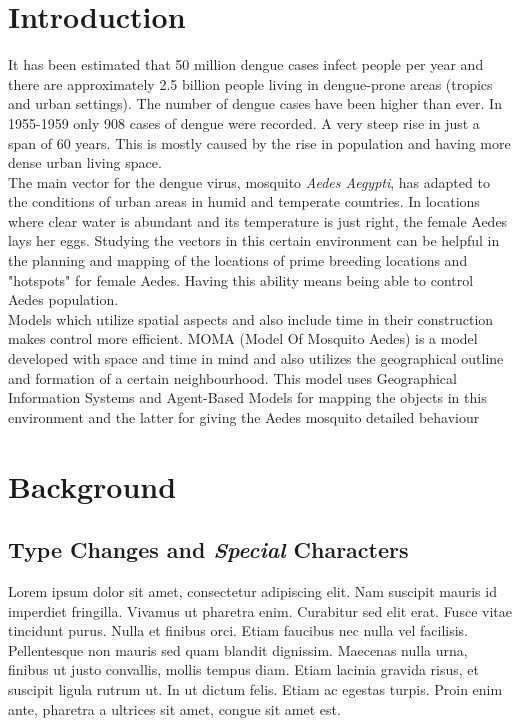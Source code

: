 \section{Introduction}

It has been estimated that 50 million dengue cases infect people per year and there are approximately 2.5 billion people living in dengue-prone areas (tropics and urban settings). The number of dengue cases have been higher than ever. In 1955-1959 only 908 cases of dengue were recorded. A very steep rise in just a span of 60 years. This is mostly caused by the rise in population and having more dense urban living space.\\

The main vector for the dengue virus, mosquito \textit{Aedes Aegypti}, has adapted to the conditions of urban areas in humid and temperate countries. In locations where clear water is abundant and its temperature is just right, the female Aedes lays her eggs. Studying the vectors in this certain environment can be helpful in the planning and mapping of the locations of prime breeding locations and "hotspots" for female Aedes. Having this ability means being able to control Aedes population.\\

Models which utilize spatial aspects and also include time in their construction makes control more efficient. MOMA (Model Of Mosquito Aedes) is a model developed with space and time in mind and also utilizes the geographical outline and formation of a certain neighbourhood. This model uses Geographical Information Systems and Agent-Based Models for mapping the objects in this environment and the latter for giving the Aedes mosquito detailed behaviour

\section{Background}



\subsection{Type Changes and {\itshape Special} Characters}

Lorem ipsum dolor sit amet, consectetur adipiscing elit. Nam suscipit mauris id imperdiet fringilla. Vivamus ut pharetra enim. Curabitur sed elit erat. Fusce vitae tincidunt purus. Nulla et finibus orci. Etiam faucibus nec nulla vel facilisis. Pellentesque non mauris sed quam blandit dignissim. Maecenas nulla urna, finibus ut justo convallis, mollis tempus diam. Etiam lacinia gravida risus, et suscipit ligula rutrum ut. In ut dictum felis. Etiam ac egestas turpis. Proin enim ante, pharetra a ultrices sit amet, congue sit amet est.

